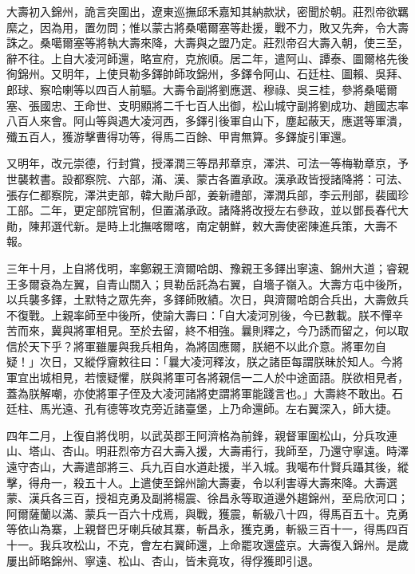 \begin{pinyinscope}
大壽初入錦州，詭言突圍出，遼東巡撫邱禾嘉知其納款狀，密聞於朝。莊烈帝欲羈縻之，因為用，置勿問；惟以蒙古將桑噶爾塞等赴援，戰不力，敗又先奔，令大壽誅之。桑噶爾塞等將執大壽來降，大壽與之盟乃定。莊烈帝召大壽入朝，使三至，辭不往。上自大凌河師還，略宣府，克旅順。居二年，遣阿山、譚泰、圖爾格先後徇錦州。又明年，上使貝勒多鐸帥師攻錦州，多鐸令阿山、石廷柱、圖賴、吳拜、郎球、察哈喇等以四百人前驅。大壽令副將劉應選、穆祿、吳三桂，參將桑噶爾塞、張國忠、王命世、支明顯將二千七百人出御，松山城守副將劉成功、趙國志率八百人來會。阿山等與遇大凌河西，多鐸引後軍自山下，塵起蔽天，應選等軍潰，殲五百人，獲游擊曹得功等，得馬二百餘、甲胄無算。多鐸旋引軍還。

又明年，改元崇德，行封賞，授澤潤三等昂邦章京，澤洪、可法一等梅勒章京，予世襲敕書。設都察院、六部，滿、漢、蒙古各置承政。漢承政皆授諸降將：可法、張存仁都察院，澤洪吏部，韓大勛戶部，姜新禮部，澤潤兵部，李云刑部，裴國珍工部。二年，更定部院官制，但置滿承政。諸降將改授左右參政，並以鄧長春代大勛，陳邦選代新。是時上北撫喀爾喀，南定朝鮮，敕大壽使密陳進兵策，大壽不報。

三年十月，上自將伐明，率鄭親王濟爾哈朗、豫親王多鐸出寧遠、錦州大道；睿親王多爾袞為左翼，自青山關入；貝勒岳託為右翼，自墻子嶺入。大壽方屯中後所，以兵襲多鐸，土默特之眾先奔，多鐸師敗績。次日，與濟爾哈朗合兵出，大壽斂兵不復戰。上親率師至中後所，使諭大壽曰：「自大凌河別後，今已數載。朕不憚辛苦而來，冀與將軍相見。至於去留，終不相強。曩則釋之，今乃誘而留之，何以取信於天下乎？將軍雖屢與我兵相角，為將固應爾，朕絕不以此介意。將軍勿自疑！」次日，又縱俘齎敕往曰：「曩大凌河釋汝，朕之諸臣每謂朕昧於知人。今將軍宜出城相見，若懷疑懼，朕與將軍可各將親信一二人於中途面語。朕欲相見者，蓋為朕解嘲，亦使將軍子侄及大凌河諸將吏謂將軍能踐言也。」大壽終不敢出。石廷柱、馬光遠、孔有德等攻克旁近諸臺堡，上乃命還師。左右翼深入，師大捷。

四年二月，上復自將伐明，以武英郡王阿濟格為前鋒，親督軍圍松山，分兵攻連山、塔山、杏山。明莊烈帝方召大壽入援，大壽甫行，我師至，乃還守寧遠。時澤遠守杏山，大壽遣部將三、兵九百自水道赴援，半入城。我噶布什賢兵躡其後，縱擊，得舟一，殺五十人。上遣使至錦州諭大壽妻，令以利害導大壽來降。大壽選蒙、漢兵各三百，授祖克勇及副將楊震、徐昌永等取道邊外趨錦州，至烏欣河口；阿爾薩蘭以滿、蒙兵一百六十戍焉，與戰，獲震，斬級八十四，得馬百五十。克勇等依山為寨，上親督巴牙喇兵破其寨，斬昌永，獲克勇，斬級三百十一，得馬四百十一。我兵攻松山，不克，會左右翼師還，上命罷攻還盛京。大壽復入錦州。是歲屢出師略錦州、寧遠、松山、杏山，皆未竟攻，得俘獲即引退。


\end{pinyinscope}
